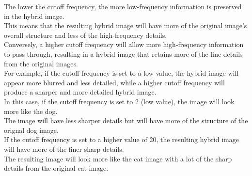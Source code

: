 The lower the cutoff frequency, the more low-frequency information is preserved in the hybrid image. \\
This means that the resulting hybrid image will have more of the original image's overall structure and less of the high-frequency details. \\
Conversely, a higher cutoff frequency will allow more high-frequency information to pass through, resulting in a hybrid image that retains more of the fine details from the original images.\\
For example, if the cutoff frequency is set to a low value, the hybrid image will appear more blurred and less detailed, while a higher cutoff frequency will produce a sharper and more detailed hybrid image.\\
In this case, if the cutoff frequency is set to 2 (low value), the image will look more like the dog. \\
The image will have less sharper details but will have more of the structure of the orignal dog image. \\
If the cutoff frequency is set to a higher value of 20, the resulting hybrid image will have more of the finer sharp details. \\
The resulting image will look more like the cat image with a lot of the sharp details from the original cat image. \\